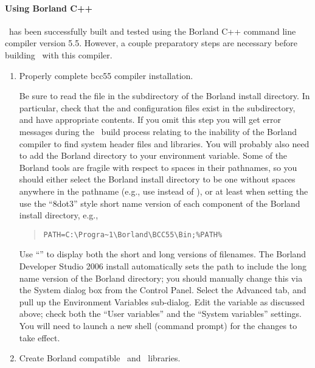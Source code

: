 \paragraph{Using Borland C++}
\OOMMF\ has been successfully built and tested using the
Borland C++ command line compiler version 5.5.
However, a couple preparatory steps are necessary before building
\OOMMF\ with this compiler.
\begin{enumerate}
\item Properly complete bcc55 compiler installation.

Be sure to read the  file in the 
subdirectory of the Borland install directory.  In particular, check
that the  and  configuration files exist
in the  subdirectory, and have appropriate contents.  If you
omit this step you will get error messages during the \OOMMF\ build
process relating to the inability of the Borland compiler to find
system header files and libraries.  You will probably also need to add
the Borland  directory to your  environment variable.
Some of the Borland tools are fragile with respect to spaces in their
pathnames, so you should either select the Borland install directory
to be one without spaces anywhere in the pathname (e.g., use
 instead of
), or at least when setting
the  use the ``8dot3'' style short name version of each
component of the Borland install directory, e.g.,
\begin{quote}
\begin{verbatim}
PATH=C:\Progra~1\Borland\BCC55\Bin;%PATH%
\end{verbatim}
\end{quote}
Use ``'' to display both the short and long versions of
filenames.  The Borland Developer Studio 2006 install automatically sets
the path to include the long name version of the Borland 
directory; you should manually change this via the System dialog box
from the Control Panel.  Select the Advanced tab, and pull up the
Environment Variables sub-dialog.  Edit the  variable as
discussed above; check both the ``User variables'' and the ``System
variables'' settings.  You will need to launch a new shell (command
prompt) for the changes to take effect.

\item Create Borland compatible \Tcl\ and \Tk\ libraries.


\end{enumerate}
